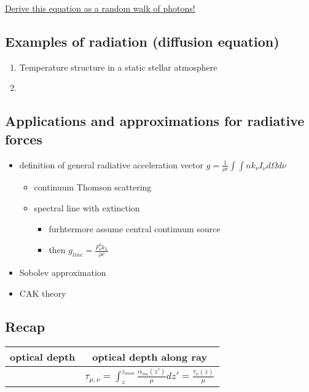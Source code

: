\documentclass[../main/main.tex]{subfiles}
\begin{document}
\underline{Derive this equation as a random walk of photons!}

\subsection{Examples of radiation (diffusion equation)}
\begin{enumerate}
\item Temperature structure in a static stellar atmosphere
\item 
\end{enumerate}

\subsection{Applications and approximations for radiative forces}
\begin{itemize}
\item definition of general radiative acceleration vector $g = \frac{1}{\rho c}\int \int n k_{\nu} I_{\nu} d\Omega d\nu$
\begin{itemize}
\item continuum Thomson scattering
\item spectral line with extinction
\begin{itemize}
\item furhtermore assume central continuum source
\item then $g_{line} = \frac{F_{\nu}^0 k_L}{\rho c}$
\end{itemize}
\end{itemize}

\item Sobolev approximation
\item CAK theory
\end{itemize}

\subsection{Recap}
\begin{center}
\centering
{\tabulinesep=1.5mm
\begin{tabu}{|c|c|}
\hline 
optical depth & optical depth along ray \\ \hline
& $\tau_{\mu,\nu} = \int_z^{z_{max}} \frac{\alpha_{nu}(z')}{\mu}dz' = \frac{\tau_{\nu}(z)}{\mu}$ \\ \hline
\end{tabu}}
\end{center}

\newpage
\end{document}
